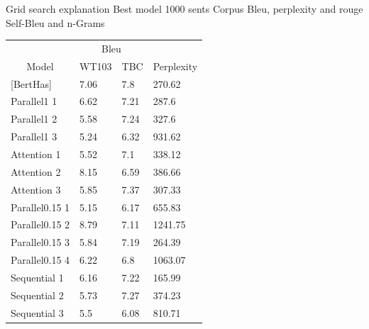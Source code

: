 \documentclass[10pt,twocolumn,letterpaper]{article}
\begin{document}
Grid search explanation
Best model 1000 sents
Corpus Bleu, perplexity and rouge
Self-Bleu and n-Grams
\begin{table}[]
\begin{tabular}{llll}
\hline
\multicolumn{1}{c}{} & \multicolumn{2}{c}{Bleu} & \multicolumn{1}{c}{\multirow{}{}{}} \\ \cline{2-3}
\multicolumn{1}{c}{\multirow{}{}{Model}}   & WT103       & TBC        & \multicolumn{1}{c}{\multirow{}{}{Perplexity}}                                \\ \hline
{[}BertHas{]}                              & 7.06        & 7.8        & 270.62                                                \\
Parallel1 1                                & 6.62        & 7.21       & 287.6                                                \\
Parallel1 2                                & 5.58        & 7.24       & 327.6                                                \\
Parallel1 3                                & 5.24        & 6.32       & 931.62                                               \\
Attention 1                                & 5.52        & 7.1        & 338.12                                                  \\
Attention 2                                & 8.15        & 6.59       & 386.66                                              \\
Attention 3                                & 5.85        & 7.37       & 307.33                                                 \\
Parallel0.15 1                             & 5.15            & 6.17           & 655.83                                                \\
Parallel0.15 2                             & 8.79            & 7.11           & 1241.75                                                 \\
Parallel0.15 3                             & 5.84            & 7.19           & 264.39                                                \\
Parallel0.15 4                             & 6.22            & 6.8           &  1063.07                                              \\
Sequential 1                               & 6.16            & 7.22           & 165.99                                                \\
Sequential 2                               & 5.73            & 7.27           & 374.23                                                 \\
Sequential 3                               & 5.5            &  6.08          &  810.71                                               \\ \hline
\end{tabular}
\end{table}
\end{document}
